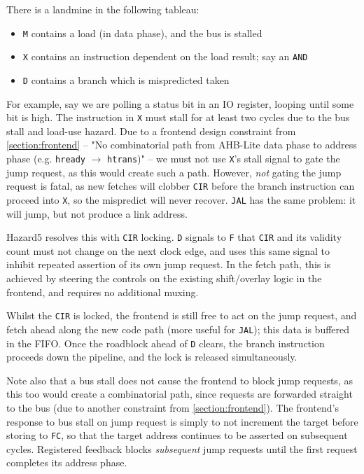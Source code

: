 There is a landmine in the following tableau:

\begin{itemize}
	\item {\tt M} contains a load (in data phase), and the bus is stalled
	\item {\tt X} contains an instruction dependent on the load result; say an {\tt AND}
	\item {\tt D} contains a branch which is mispredicted taken
\end{itemize}

For example, say we are polling a status bit in an IO register, looping until some bit is high. The instruction in {\tt X} must stall for at least two cycles due to the bus stall and load-use hazard. Due to a frontend design constraint from \ref{section:frontend} -- "No combinatorial path from AHB-Lite data phase to address phase (e.g. {\tt hready} $\to$ {\tt htrans})" -- we must not use {\tt X}'s stall signal to gate the jump request, as this would create such a path. However, {\it not} gating the jump request is fatal, as new fetches will clobber {\tt CIR} before the branch instruction can proceed into {\tt X}, so the mispredict will never recover. {\tt JAL} has the same problem: it will jump, but not produce a link address.

Hazard5 resolves this with {\tt CIR} locking. {\tt D} signals to {\tt F} that {\tt CIR} and its validity count must not change on the next clock edge, and uses this same signal to inhibit repeated assertion of its own jump request. In the fetch path, this is achieved by steering the controls on the existing shift/overlay logic in the frontend, and requires no additional muxing.

Whilst the {\tt CIR} is locked, the frontend is still free to act on the jump request, and fetch ahead along the new code path (more useful for {\tt JAL}); this data is buffered in the FIFO. Once the roadblock ahead of {\tt D} clears, the branch instruction proceeds down the pipeline, and the lock is released simultaneously.

Note also that a bus stall does not cause the frontend to block jump requests, as this too would create a combinatorial path, since requests are forwarded straight to the bus (due to another constraint from \ref{section:frontend}). The frontend's response to bus stall on jump request is simply to not increment the target before storing to {\tt FC}, so that the target address continues to be asserted on subsequent cycles. Registered feedback blocks {\it subsequent} jump requests until the first request completes its address phase.

